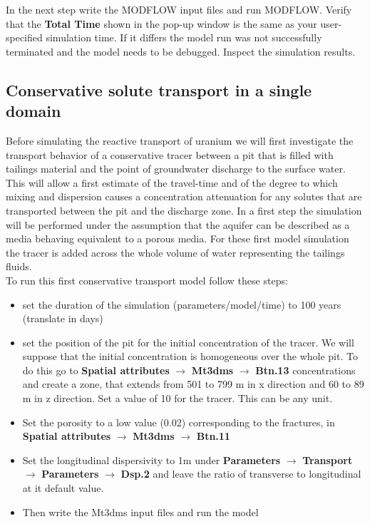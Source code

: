 In the next step write the MODFLOW input files and run MODFLOW.
Verify that the {\color{blue}\textbf{Total Time}} shown in the  
pop-up window is the same as your user-specified simulation time. 
If it differs the model run was
not successfully terminated and the model needs to be debugged. 
Inspect the simulation results.

\subsection{Conservative solute transport in a single domain}

Before simulating the reactive transport of uranium we will 
first investigate the transport behavior of a conservative tracer
between a pit that is filled with tailings material and the point of
groundwater discharge to the surface water.
This will allow a first estimate of the travel-time and of the degree
to which mixing and dispersion causes a concentration attenuation 
for any solutes that are transported between the pit and the discharge zone.
In a first step the simulation will be performed under the assumption that 
the aquifer can be described as a media behaving equivalent to a porous media. 
 For these first model simulation the tracer is added across the whole volume 
of water representing the tailings fluids. \\
To run this first conservative transport model follow these steps:

\begin{itemize}
\item set the duration of the simulation (parameters/model/time) to 100 years 
(translate in days)
\item	set the position of the pit for the initial concentration 
of the tracer. We will suppose that the initial concentration 
is homogeneous over the whole pit. 
To do this go to 
{\color{blue}\textbf{Spatial attributes}} 
$\rightarrow$ {\color{blue}\textbf{Mt3dms}} 
$\rightarrow$ {\color{blue}\textbf{Btn.13}}
concentrations and create a zone, that extends from 501 to 799 m in x direction 
and 60 to 89 m in z direction. Set a value of 10 for the tracer. 
This can be any unit.
\item Set the porosity to a low value (0.02) corresponding to the fractures, in 
{\color{blue}\textbf{Spatial attributes}} 
$\rightarrow$ {\color{blue}\textbf{Mt3dms}} 
$\rightarrow$ {\color{blue}\textbf{Btn.11}}
\item Set the longitudinal dispersivity to 1m 
under 
{\color{blue}\textbf{Parameters}} 
$\rightarrow$ {\color{blue}\textbf{Transport}} 
$\rightarrow$ {\color{blue}\textbf{Parameters}}
$\rightarrow$ {\color{blue}\textbf{Dsp.2}}
and leave the ratio of transverse to longitudinal at it default value.
\item Then write the Mt3dms input files and run the model
\end{itemize}

